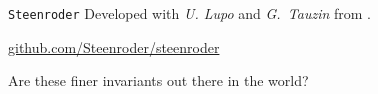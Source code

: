\begin{frame}{\texttt{Steenroder}}
	Developed with \textit{U. Lupo} and \textit{G.~Tauzin} from .

	\begin{center}
		\hyperlink{https.github.com/Steenroder/steenroder.com}{github.com/Steenroder/steenroder}
	\end{center}

	\pause\bigskip
	 Are these finer invariants out there in the world?
\end{frame}


